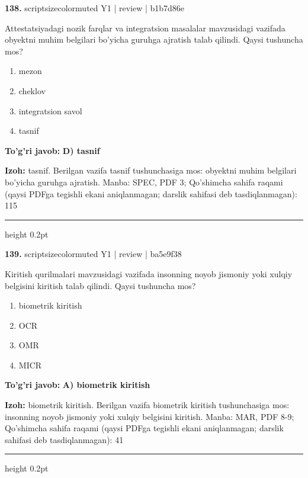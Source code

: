 \documentclass[10pt,a4paper]{article}
\begin{document}
{\bfseries\sffamily\color{ink} 138.} {scriptsizecolor{muted} Y1 | review | b1b7d86e}
\par
Attestatsiyadagi nozik farqlar va integratsion masalalar mavzusidagi vazifada obyektni muhim belgilari bo'yicha guruhga ajratish talab qilindi. Qaysi tushuncha mos?
\begin{enumerate}[label=\Alph*),leftmargin=9mm]
\item mezon
\item cheklov
\item integratsion savol
\item tasnif
\end{enumerate}
\begin{tcolorbox}[enhanced,breakable,colback=teal!4,colframe=teal!60!black,boxrule=0.45pt,arc=1.2mm,left=2.7mm,right=2.7mm,top=1.8mm,bottom=1.8mm,before skip=2mm,after skip=2mm]
{\bfseries\sffamily\color{teal}To'g'ri javob:} \textbf{D) tasnif}
\par\smallskip
{\bfseries Izoh:} tasnif. Berilgan vazifa tasnif tushunchasiga mos: obyektni muhim belgilari bo'yicha guruhga ajratish. Manba: SPEC, PDF 3; Qo'shimcha sahifa raqami (qaysi PDFga tegishli ekani aniqlanmagan; darslik sahifasi deb tasdiqlanmagan): 115
\end{tcolorbox}
\vspace{2mm}\hrule height 0.2pt\vspace{3mm}

{\bfseries\sffamily\color{ink} 139.} {scriptsizecolor{muted} Y1 | review | ba5e9f38}
\par
Kiritish qurilmalari mavzusidagi vazifada insonning noyob jismoniy yoki xulqiy belgisini kiritish talab qilindi. Qaysi tushuncha mos?
\begin{enumerate}[label=\Alph*),leftmargin=9mm]
\item biometrik kiritish
\item OCR
\item OMR
\item MICR
\end{enumerate}
\begin{tcolorbox}[enhanced,breakable,colback=teal!4,colframe=teal!60!black,boxrule=0.45pt,arc=1.2mm,left=2.7mm,right=2.7mm,top=1.8mm,bottom=1.8mm,before skip=2mm,after skip=2mm]
{\bfseries\sffamily\color{teal}To'g'ri javob:} \textbf{A) biometrik kiritish}
\par\smallskip
{\bfseries Izoh:} biometrik kiritish. Berilgan vazifa biometrik kiritish tushunchasiga mos: insonning noyob jismoniy yoki xulqiy belgisini kiritish. Manba: MAR, PDF 8-9; Qo'shimcha sahifa raqami (qaysi PDFga tegishli ekani aniqlanmagan; darslik sahifasi deb tasdiqlanmagan): 41
\end{tcolorbox}
\vspace{2mm}\hrule height 0.2pt\vspace{3mm}
\end{document}

